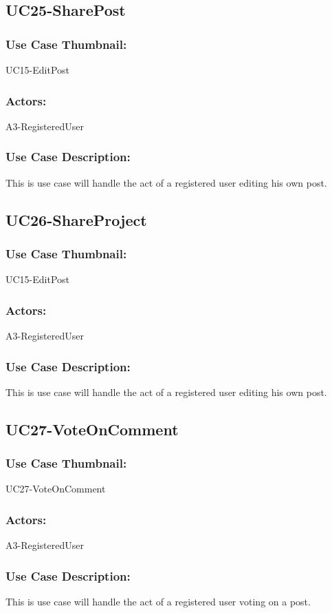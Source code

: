 \documentclass[11pt, openany]{report}
\begin{document}
\subsection{UC25-SharePost}
\label{sUC25}
\subsubsection*{Use Case Thumbnail:}
UC15-EditPost
\subsubsection*{Actors:}
A3-RegisteredUser
\subsubsection*{Use Case Description:}
This is use case will handle the act of a registered user editing his own post. 

\subsection{UC26-ShareProject}
\label{sUC26}
\subsubsection*{Use Case Thumbnail:}
UC15-EditPost
\subsubsection*{Actors:}
A3-RegisteredUser
\subsubsection*{Use Case Description:}
This is use case will handle the act of a registered user editing his own post. 

\subsection{UC27-VoteOnComment}
\label{sUC27}
\subsubsection*{Use Case Thumbnail:}
UC27-VoteOnComment
\subsubsection*{Actors:}
A3-RegisteredUser
\subsubsection*{Use Case Description:}
This is use case will handle the act of a registered user voting on a post.
\end{document}
